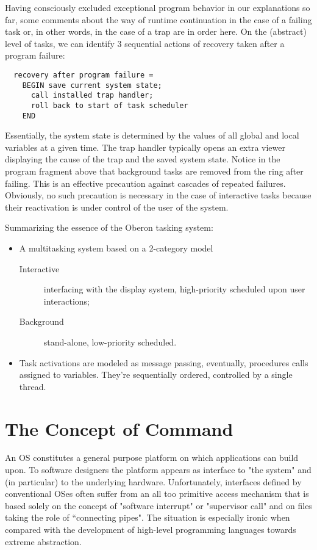 Having consciously excluded exceptional program behavior in our explanations so far, some
comments about the way of runtime continuation in the case of a failing task or, in other
words, in the case of a trap are in order here. On the (abstract) level of tasks, we can
identify 3 sequential actions of recovery taken after a program failure:
\begin{verbatim}
  recovery after program failure =
    BEGIN save current system state;
      call installed trap handler;
      roll back to start of task scheduler
    END
\end{verbatim}
Essentially, the system state is determined by the values of all global and local variables
at a given time. The trap handler typically opens an extra viewer displaying the cause of
the trap and the saved system state. Notice in the program fragment above that background
tasks are removed from the ring after failing. This is an effective precaution against
cascades of repeated failures. Obviously, no such precaution is necessary in the case of
interactive tasks because their reactivation is under control of the user of the system.

Summarizing the essence of the Oberon tasking system:
\begin{itemize}
  \item A multitasking system based on a 2-category model
  \begin{description}
    \item[Interactive] interfacing with the display system,
      high-priority scheduled upon user interactions;
    \item[Background] stand-alone, low-priority scheduled.
  \end{description}
  \item Task activations are modeled as message passing,
    eventually, procedures calls assigned to variables.
    They're sequentially ordered, controlled by a single thread.
\end{itemize}

\section{The Concept of Command}
\label{sec:command}
An OS constitutes a general purpose platform on which applications can build upon. To
software designers the platform appears as interface to "the system" and (in particular)
to the underlying hardware. Unfortunately, interfaces defined by conventional OSes often
suffer from an all too primitive access mechanism that is based solely on the concept of
"software interrupt" or "supervisor call" and on files taking the role of “connecting pipes".
The situation is especially ironic when compared with the development of high-level
programming languages towards extreme abstraction.

